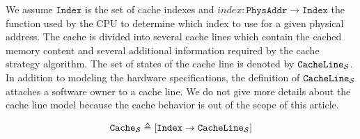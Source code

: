 We assume $\texttt{Index}$ is the set of cache indexes and $index :
\texttt{PhysAddr} \rightarrow \texttt{Index}$ the function used by the CPU to
determine which index to use for a given physical address. The cache is divided
into several cache lines which contain the cached memory content and several
additional information required by the cache strategy algorithm. The set of
states of the cache line is denoted by $\texttt{CacheLine}_{\mathcal{S}}$. In
addition to modeling the hardware specifications, the definition of
$\texttt{CacheLine}_{\mathcal{S}}$ attaches a software owner to a cache line. We do
not give more details about the cache line model because the cache behavior is
out of the scope of this article.


\[ \texttt{Cache}_{\mathcal{S}} \triangleq [ \texttt{Index} \rightarrow
\texttt{CacheLine}_{\mathcal{S}} ] \]

